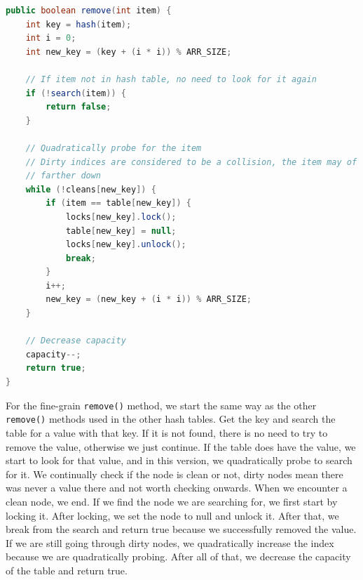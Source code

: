 \documentclass[conference]{IEEEtran}
\begin{document}
\begin{lstlisting}[language={Java},caption=Source code for the fine-grain remove() method.,captionpos=b,breaklines=true,frame=single]
public boolean remove(int item) {
    int key = hash(item);
    int i = 0;
    int new_key = (key + (i * i)) % ARR_SIZE;

    // If item not in hash table, no need to look for it again
    if (!search(item)) {
        return false;
    }

    // Quadratically probe for the item
    // Dirty indices are considered to be a collision, the item may of been probed
    // farther down
    while (!cleans[new_key]) {
        if (item == table[new_key]) {
            locks[new_key].lock();
            table[new_key] = null;
            locks[new_key].unlock();
            break;
        }
        i++;
        new_key = (new_key + (i * i)) % ARR_SIZE;
    }

    // Decrease capacity
    capacity--;
    return true;
}
\end{lstlisting}
For the fine-grain \verb|remove()| method, we start the same way as the other \verb|remove()| methods used in the other hash tables.
Get the key and search the table for a value with that key. If it is not found, there is no need to try to remove the value, otherwise we just continue.
If the table does have the value, we start to look for that value, and in this version, we quadratically probe to search for it. We continually check if the node is clean or not, dirty nodes mean there was never a value there and not worth checking onwards.
When we encounter a clean node, we end. If we find the node we are searching for, we first start by locking it. After locking, we set the node to null and unlock it. After that, we break from the search and return true because we successfully removed the value.
If we are still going through dirty nodes, we quadratically increase the index because we are quadratically probing. After all of that, we decrease the capacity of the table and return true.
\end{document}
